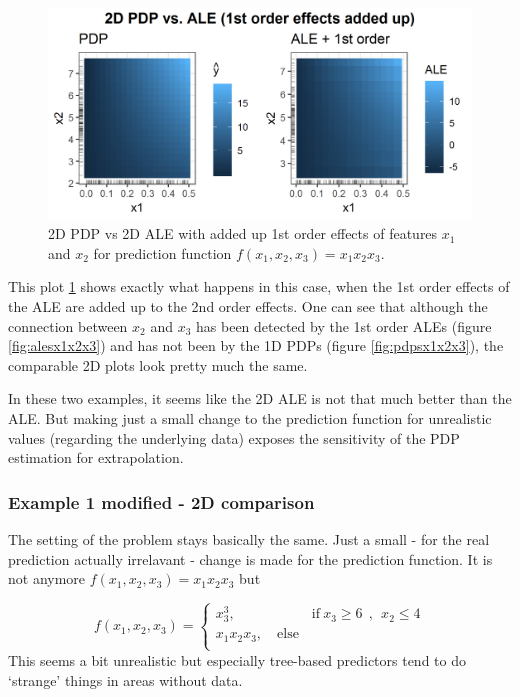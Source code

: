 \documentclass[]{krantz}
\begin{document}
\begin{figure}
\includegraphics[width=1\linewidth]{images/ale_1_comp_2d_1st_orders_added_x1x2x3_150_0_0p5_5_1} \caption{2D PDP vs 2D ALE with added up 1st order
effects of features \(x_1\) and \(x_2\) for prediction function
\(f(x_1, x_2, x_3) = x_1 x_2 x_3\).}\label{fig:ale2DaddedUpx1x2x3}
\end{figure}





This plot \ref{fig:ale2DaddedUpx1x2x3} shows exactly what happens in
this case, when the 1st order effects of the ALE are added up to the 2nd
order effects. One can see that although the connection between \(x_2\)
and \(x_3\) has been detected by the 1st order ALEs (figure
\ref{fig:alesx1x2x3}) and has not been by the 1D PDPs (figure
\ref{fig:pdpsx1x2x3}), the comparable 2D plots look pretty much the
same.

In these two examples, it seems like the 2D ALE is not that much better
than the ALE. But making just a small change to the prediction function
for unrealistic values (regarding the underlying data) exposes the
sensitivity of the PDP estimation for extrapolation.

\subsubsection{Example 1 modified - 2D
comparison}\label{example-1-modified---2d-comparison}

The setting of the problem stays basically the same. Just a small - for
the real prediction actually irrelavant - change is made for the
prediction function. It is not anymore
\(f(x_1, x_2, x_3) = x_1 x_2 x_3\) but

\[
f(x_1, x_2, x_3) =  
     \begin{cases}
       x_3^3, \quad\quad\quad\quad\quad~~\text{if}~x_3\ge6 ~~, ~~x_2\le4\\
       x_1 x_2 x_3, \quad\text{else}\\
     \end{cases}
\] This seems a bit unrealistic but especially tree-based predictors
tend to do `strange' things in areas without data.
\end{document}

